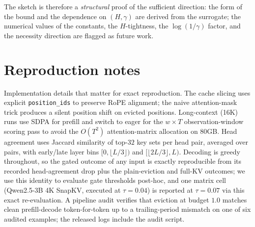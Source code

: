 \documentclass{article} %
\begin{document}
The sketch is therefore a \emph{structural} proof of the sufficient
direction: the form of the bound and the dependence on $(H, \gamma)$
are derived from the surrogate; the numerical values of the constants,
the $H$-tightness, the $\log(1/\gamma)$ factor, and the necessity
direction are flagged as future work.

\section{Reproduction notes}
\label{app:repro}
Implementation details that matter for exact reproduction. The cache
slicing uses explicit \texttt{position\_ids} to preserve RoPE alignment;
the naive attention-mask trick produces a silent position shift on
evicted positions. Long-context (16K) runs use SDPA for prefill and
switch to eager for the $w \times T$ observation-window scoring pass to
avoid the $O(T^2)$ attention-matrix allocation on 80GB. Head agreement
uses Jaccard similarity of top-$32$ key sets per head pair, averaged
over pairs, with early/late layer bins $[0, \lfloor L/3 \rfloor)$ and
$[\lfloor 2L/3 \rfloor, L)$. Decoding is greedy throughout, so the
gated outcome of any input is exactly reproducible from its recorded
head-agreement drop plus the plain-eviction and full-KV outcomes; we
use this identity to evaluate gate thresholds post-hoc, and one matrix
cell (Qwen2.5-3B 4K SnapKV, executed at $\tau = 0.04$) is reported at
$\tau = 0.07$ via this exact re-evaluation. A pipeline audit verifies
that eviction at budget $1.0$ matches clean prefill-decode
token-for-token up to a trailing-period mismatch on one of six audited
examples; the released logs include the audit script.
\end{document}
